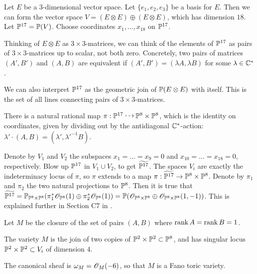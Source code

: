 Let $E$ be a 3-dimensional vector space. Let $\{e_1,e_2,e_3\}$ be a basis for $E$. Then we can form the vector space $V=(E \otimes E) \oplus (E \otimes E)$, which has dimension $18$. Let $\P^{17}=\P(V)$. Choose coordinates $x_1,\ldots,x_{18}$ on $\P^{17}$. 

Thinking of $E \otimes E$ as $3 \times 3$-matrices, we can think of the elements of $\P^{17}$ as pairs of $3 \times 3$-matrices up to scalar, not both zero. Concretely, two pairs of matrices $(A',B')$ and $(A,B)$ are equivalent if $(A',B') = (\lambda A, \lambda B)$ for some $\lambda \in \C^\ast$.

We can also interpret $\P^{17}$ as the geometric join of $\P(E \otimes E)$ with itself. This is the set of all lines connecting pairs of $3 \times 3$-matrices.

There is a natural rational map $\pi:\P^{17} \rmap \P^8 \times \P^8$, which is the identity on coordinates, given by dividing out by the antidiagonal $\C^\ast$-action: $\lambda' \cdot (A,B) = (\lambda',{\lambda'}^{-1} B)$.

\begin{remark}
Denote by $V_1$ and $V_2$ the subspaces ${x_1=\ldots=x_9=0}$ and ${x_{10}=\ldots=x_{18}=0}$, respectively. Blow up $\P^{17}$ in $V_1 \cup V_2$, to get $\widetilde{\P^{17}}$. The spaces $V_i$ are exactly the indeterminacy locus of $\pi$, so $\pi$ extends to a map $\pi:\widetilde{\P^{17}} \to \P^8 \times \P^8$. Denote by $\pi_1$ and $\pi_2$ the two natural projections to $\P^8$. Then it is true that $\widetilde{\P^{17}}= \P_{\P^8 \times \P^8}(\pi_1^\ast \OO_{\P^8}(1) \oplus \pi_2^\ast \OO_{\P^8}(1))=\P(\OO_{\P^8\times \P^8} \oplus \OO_{\P^8 \times \P^8}(1,-1))$. This is explained further in Section C7 in \cite{altman_joins}.
\end{remark}

Let $M$ be the closure of the set of pairs $(A,B)$ where $\rank A = \rank B = 1$.  

\begin{proposition}
\label{prop:m}
The variety $M$ is the join of two copies of $\P^2 \times \P^2 \subset \P^8$, and has singular locus $\P^2 \times \P^2 \subset V_i$ of dimension $4$.

The canonical sheaf is $\omega_M = \OO_M(-6)$, so that $M$ is a Fano toric variety.
\end{proposition}

